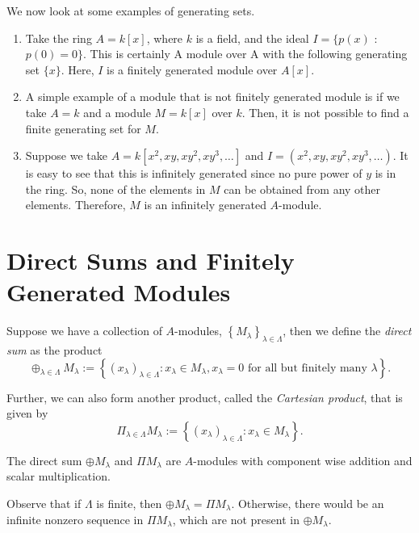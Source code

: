 \begin{example}
We now look at some examples of generating sets. 
    \begin{enumerate}
        \item Take the ring $A=k[x]$, where $k$ is a field, and the ideal $I=\{p(x)$ : $p(0)=0\}$. This is certainly A module over A with the following generating set $\{x\}$. Here, $I$ is a finitely generated module over $A[x]$.
        \item A simple example of a module that is  not finitely generated module is if we take $A=k$ and a module $M=k[x]$ over $k$. Then, it is not possible to find a finite generating set for $M$.
        \item Suppose we take $A=k\left[x^{2}, x y, x y^{2}, x y^{3}, \ldots\right]$ and $I=\left(x^{2}, x y, x y^{2}, x y^{3}, \ldots\right)$. It is easy to see that this is infinitely generated since no pure power of $y$ is in the ring. So, none of the elements in $M$ can be obtained from any other elements. Therefore, $M$ is an infinitely generated $A$-module.
    \end{enumerate}
\end{example}

\section{Direct Sums and Finitely Generated Modules}
\begin{definition}
 Suppose we have a collection of $A$-modules, $\left\{M_{\lambda}\right\}_{\lambda \in \Lambda}$, then we define the {\it direct sum} as the product
$$
\oplus_{\lambda \in \Lambda} M_{\lambda}:=\left\{\left(x_{\lambda}\right)_{\lambda \in \Lambda}: x_{\lambda} \in M_{\lambda}, x_{\lambda}=0 \text { for all but finitely many } \lambda\right\}.
$$   
\end{definition}

Further, we can also form another product, called the {\it Cartesian product}, that is given by
$$
\Pi_{\lambda \in \Lambda} M_{\lambda}:=\left\{\left(x_{\lambda}\right)_{\lambda \in \Lambda}: x_{\lambda} \in M_{\lambda}\right\}.
$$

\begin{remark}
    The direct sum $\oplus M_{\lambda}$ and $\Pi M_{\lambda}$ are $A$-modules with component wise addition and scalar multiplication.
\end{remark}

Observe that if $\Lambda$ is finite, then $\oplus M_{\lambda}=\Pi M_{\lambda}$. Otherwise, there would be an infinite nonzero sequence in $\Pi M_{\lambda}$, which are not present in $\oplus M_{\lambda}$.

